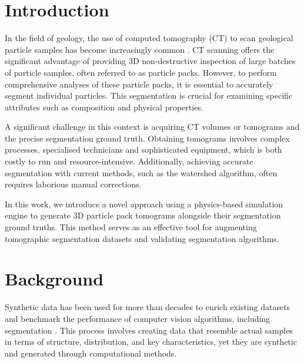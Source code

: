 \documentclass[preprint,12pt]{elsarticle}
\begin{document}
\section{Introduction} \label{sec:introduction}
In the field of geology, the use of computed tomography (CT) to scan geological particle samples has become increasingly common \cite{VANGEET200025, cnudde20123d, warlo2021multi}.
CT scanning offers the significant advantage of providing 3D non-destructive inspection of large batches of particle samples, often referred to as particle packs.
However, to perform comprehensive analyses of these particle packs, it is essential to accurately segment individual particles. 
This segmentation is crucial for examining specific attributes such as composition and physical properties.

A significant challenge in this context is acquiring CT volumes or tomograms and the precise segmentation ground truth.
Obtaining tomograms involves complex processes, specialised technicians and sophisticated equipment, which is both costly to run and resource-intensive. 
Additionally, achieving accurate segmentation with current methods, such as the watershed algorithm, often requires laborious manual corrections.

In this work, we introduce a novel approach using a physics-based simulation engine to generate 3D particle pack tomograms alongside their segmentation ground truths. 
This method serves as an effective tool  for augmenting tomographic segmentation datasets and validating segmentation algorithms.


\section{Background}
Synthetic data has been used for more than decades to enrich existing datasets and benchmark the performance of computer vision algorithms, including segmentation \citep{richter2016playingdatagroundtruth}.
This process involves creating data that resemble actual samples in terms of structure, distribution, and key characteristics, yet they are synthetic and generated through computational methods.
\end{document}
